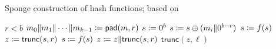 \begin{algorithm}[p]
\caption{Sponge construction of hash functions;
    based on~\cite[Alg.~1]{KeccakSponge2011}}
\label{alg:sponge_construction}
\begin{algorithmic}[1]
\Require $r < b$
    \State $m_{0}\|m_{1}\|\cdots\|m_{k-1} \coloneqq{} \textsf{pad}(m, r)$
    \State $s \coloneqq{} 0^{b}$
        \State $s \coloneqq{} s \oplus (m_{i}\|0^{b-r})$
        \State $s \coloneqq{} f(s)$
    \EndFor
    \State $z \coloneqq{} \textsf{trunc}(s, r)$
        \State $s \coloneqq{} f(s)$
        \State $z \coloneqq{} z\|\textsf{trunc}(s, r)$
    \EndWhile
    \State \Return $\textsf{trunc}(z, \ell)$
\EndProcedure
\end{algorithmic}
\end{algorithm}
